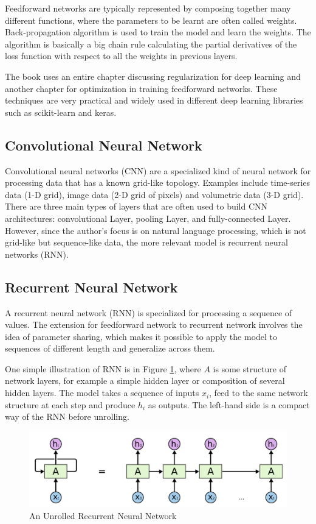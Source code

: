 \documentclass[11pt]{article}
\theoremstyle{plain}
\begin{document}
Feedforward networks are typically represented by composing together many 
different functions, where the parameters to be learnt are often called 
weights. Back-propagation algorithm is used to train the model and learn the 
weights. The algorithm is basically a big chain rule calculating the partial 
derivatives of the loss function with respect to all the weights in previous 
layers. 

The book \cite{Goodfellow-et-al-2016} uses an entire chapter discussing 
regularization for deep learning and another chapter for optimization in 
training feedforward networks. These techniques are very practical and 
widely used in different deep learning libraries such as scikit-learn and keras. 

\subsection{Convolutional Neural Network}
Convolutional neural networks (CNN) are a specialized kind of neural network 
for processing data that has a known grid-like topology. Examples include 
time-series data (1-D grid), image data (2-D grid of pixels) and volumetric 
data (3-D grid). There are three main types of layers that are often used to 
build CNN architectures: convolutional Layer, pooling Layer, and 
fully-connected Layer. However, since the author's focus is on natural 
language processing, which is not grid-like but sequence-like data, the more 
relevant model is recurrent neural networks (RNN).

\subsection{Recurrent Neural Network}
A recurrent neural network (RNN) is specialized for processing a sequence of 
values. The extension for feedforward network to recurrent network involves 
the idea of parameter sharing, which makes it possible to apply the model to 
sequences of different length and generalize across them. 

One simple illustration of RNN is in Figure \ref{fg:unroll-rnn}, where $A$ is 
some structure of network layers, for example a simple hidden layer or 
composition of several hidden layers. The model takes a sequence of inputs 
$x_i$, feed to the same network structure at each step and produce $h_i$ as 
outputs. The left-hand side is a compact way of the RNN before unrolling. 

\begin{figure}[!ht]
	\centering\includegraphics[width=\columnwidth]{images/unfold-rnn.png}
	\caption{An Unrolled Recurrent Neural Network 
	\cite{olah-blog-lstm}}\label{fg:unroll-rnn}
\end{figure}
\end{document}

